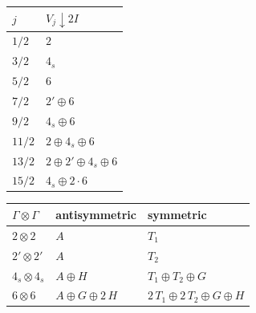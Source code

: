 \begin{tabular}{ll}
\hline
$j$ & $V_j \downarrow 2I$ \\
\hline
$1/2$ & $2$ \\
$3/2$ & $4_s$ \\
$5/2$ & $6$ \\
$7/2$ & $2' \oplus 6$ \\
$9/2$ & $4_s \oplus 6$ \\
$11/2$ & $2 \oplus 4_s \oplus 6$ \\
$13/2$ & $2 \oplus 2' \oplus 4_s \oplus 6$ \\
$15/2$ & $4_s \oplus 2\cdot 6$ \\
\hline
\end{tabular}

\begin{tabular}{lll}
\hline
$\Gamma \otimes \Gamma$ & antisymmetric & symmetric \\
\hline
$2\otimes 2$ & $A$ & $T_1$ \\
$2'\otimes 2'$ & $A$ & $T_2$ \\
$4_s\otimes 4_s$ & $A \oplus H$ & $T_1 \oplus T_2 \oplus G$ \\
$6\otimes 6$ & $A \oplus G \oplus 2\,H$ & $2\,T_1 \oplus 2\,T_2 \oplus G \oplus H$ \\
\hline
\end{tabular}
